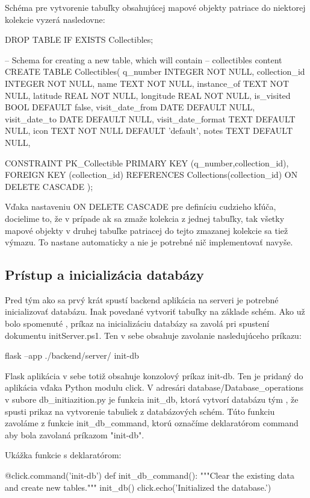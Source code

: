 Schéma pre vytvorenie tabuľky obsahujúcej mapové objekty patriace do niektorej kolekcie vyzerá nasledovne: 
\begin{code}
      DROP TABLE IF EXISTS Collectibles;

      -- Schema for creating a new table, which will contain
      -- collectibles content
      CREATE TABLE Collectibles( 
      q_number INTEGER NOT NULL,
      collection_id INTEGER NOT NULL,
      name TEXT NOT NULL,
      instance_of TEXT NOT NULL, 
      latitude REAL NOT NULL, 
      longitude REAL NOT NULL, 
      is_visited BOOL DEFAULT false,
      visit_date_from DATE DEFAULT NULL,
      visit_date_to DATE DEFAULT NULL, 
      visit_date_format TEXT DEFAULT NULL, 
      icon TEXT NOT NULL DEFAULT 'default', 
      notes TEXT DEFAULT NULL, 

      CONSTRAINT PK_Collectible PRIMARY KEY (q_number,collection_id),   
      FOREIGN KEY (collection_id) REFERENCES Collections(collection_id) 
      ON DELETE CASCADE   
      );
\end{code}

Vďaka nastaveniu ON DELETE CASCADE pre definíciu cudzieho kľúča, docielime to, že v prípade ak sa zmaže kolekcia z jednej tabuľky, tak všetky mapové objekty v druhej tabuľke patriacej do tejto zmazanej kolekcie sa tiež výmazu. 
To nastane automaticky a nie je potrebné nič implementovať navyše. 

\subsection*{Prístup a inicializácia databázy }
Pred tým ako sa prvý krát spustí backend aplikácia na serveri je potrebné  inicializovať databázu. Inak povedané vytvoriť tabuľky na základe schém. Ako už bolo spomenuté , príkaz na inicializáciu databázy sa zavolá pri spustení dokumentu initServer.ps1. 
Ten v sebe obsahuje zavolanie nasledujúceho príkazu:
\begin{code}
      flask --app ./backend/server/ init-db
\end{code}
Flask aplikácia v sebe totiž obsahuje konzolový príkaz init-db. Ten je pridaný do aplikácia vďaka Python modulu click. 
V adresári  database/Database\_operations v subore db\_initiazition.py je funkcia init\_db, ktorá vytvorí databázu tým , že spusti prikaz na vytvorenie tabuliek z databázových schém. Túto funkciu zavoláme z funkcie init\_db\_command, ktorú označíme deklaratórom command aby bola zavolaná 
príkazom "init-db". 

Ukážka funkcie s deklaratórom: 
\begin{code}
      @click.command('init-db')
      def init_db_command():
      """Clear the existing data and create new tables."""
      init_db()
      click.echo('Initialized the database.')
\end{code}

